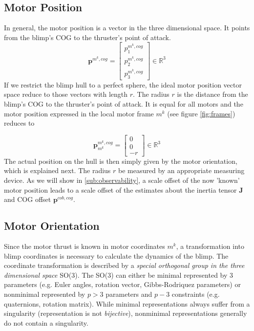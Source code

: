 \subsection{Motor Position}
\label{sub:par_position}
In general, the motor position is a vector in the three dimensional space.
It points from the blimp's COG to the thruster's point of attack.
\begin{equation*}
\mathbf{p}^{m^k,cog}
=
\left[ \begin{array}{c}
p^{m^k,cog}_1 \\
p^{m^k,cog}_2 \\
p^{m^k,cog}_3
\end{array} \right]
\in \mathbb{R}^3
\end{equation*}
If we restrict the blimp hull to a perfect sphere, the ideal motor position vector space reduce to those vectors with length $r$.
The radius $r$ is the distance from the blimp's COG to the thruster's point of attack.
It is equal for all motors and the motor position expressed in the local motor frame $m^k$ (see figure \ref{fig:frames}) reduces to

\begin{equation}
\label{eq:motor_position}
\mathbf{p}^{m^k,cog}_{m^k}
=
\left[ \begin{array}{c}
0 \\
0 \\
-r
\end{array} \right]
\in \mathbb{R}^3
\end{equation}
The actual position on the hull is then simply given by the motor orientation, which is explained next.
The radius $r$ be measured by an appropriate measuring device.
As we will show in \cref{sub:observability}, a scale offset of the now 'known' motor position leads to a scale offset of the estimates about the inertia tensor $\mathbf{J}$ and COG offset $\mathbf{p}^{cob,cog}$.

\subsection{Motor Orientation}
\label{sub:par_orientation}
Since the motor thrust is known in motor coordinates $m^k$, a transformation into blimp coordinates is necessary to calculate the dynamics of the blimp.
The coordinate transformation is described by a \textit{special orthogonal group in the three dimensional space} SO(3).
The SO(3) can either be minimal represented by $3$ parameters 
(e.g. Euler angles, rotation vector, Gibbs-Rodriquez parameters) 
or nonminimal represented by $p>3$ parameters and $p-3$ constraints 
(e.g. quaternions, rotation matrix).
While minimal representations always suffer from a singularity (representation is not \textit{bijective}), nonminimal representations generally do not contain a singularity.
\\

